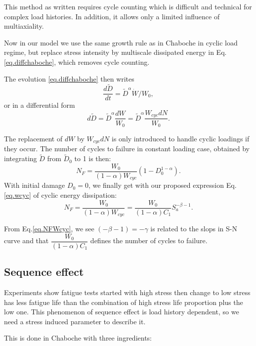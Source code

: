 \documentclass[3p,times,procedia,number]{elsarticle}
\begin{document}
This method as written requires cycle counting which is difficult and technical for complex load histories. In addition, it allows only a limited influence of multiaxiality.


Now in our model we use the same growth rule as in Chaboche in cyclic load regime, but replace stress intensity by multiscale dissipated energy  in Eq.\eqref{eq.diffchaboche}, which removes cycle counting.

The evolution \eqref{eq.diffchaboche} then writes
$$
\dfrac{d\tilde{D}}{dt} ={\tilde{D}}^\alpha \dot{W}/W_0,
$$
or in a differential form
\begin{equation}
d \tilde{D}=\tilde{D}^\alpha\dfrac{d W}{W_0}=\tilde{D}^\alpha\dfrac{W_{cyc}d N}{W_0}.
\label{eq.DWcyc}
\end{equation}

The replacement of $d W$ by $W_{cyc}dN$ is only introduced to handle cyclic loadings if they occur. The number of cycles to failure in constant loading case, obtained by integrating $\tilde{D}$ from $\tilde{D}_0$ to 1 is then:
$$N_F=\dfrac{W_0}{\left( 1-\alpha\right)W_{cyc} }\left( 1-D_0^{1-\alpha}\right) .$$
With initial damage $D_0=0$, we finally get with our proposed expression Eq.\eqref{eq.wcyc} of cyclic energy dissipation:
\begin{equation}
N_F=\dfrac{W_0}{\left( 1-\alpha\right)W_{cyc} }=\dfrac{W_0}{(1-\alpha)C_1}S_{a}^{-\beta-1}.
\label{eq.NFWcyc}
\end{equation}

From Eq.\eqref{eq.NFWcyc}, we see $(-\beta-1)=-\gamma$ is related to the slops in S-N curve and that $\dfrac{W_0}{(1-\alpha)C_1}$ defines the number of cycles to failure.
\subsection{Sequence effect}

Experiments show fatigue tests started with high stress then change to low stress has less fatigue life than the combination of high stress life proportion plus the low one. This phenomenon of sequence effect is load history dependent, so we need a stress induced parameter to describe it. 

This is done in Chaboche  with three ingredients:
\end{document}
